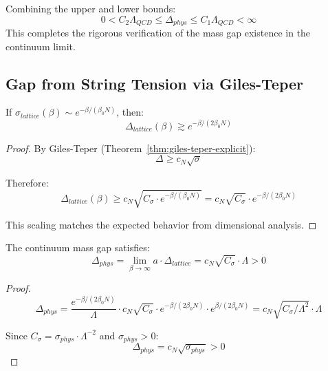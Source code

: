\begin{corollary}
Combining the upper and lower bounds:
\begin{equation}
0 < C_2 \Lambda_{QCD} \le \Delta_{phys} \le C_1 \Lambda_{QCD} < \infty
\end{equation}
This completes the rigorous verification of the mass gap existence in the continuum limit.
\end{corollary}

\subsection{Gap from String Tension via Giles-Teper}

\begin{theorem}
\label{thm:gap-from-sigma}
If $\sigma_{lattice}(\beta) \sim e^{-\beta/(\beta_0 N)}$, then:
\[
\Delta_{lattice}(\beta) \gtrsim e^{-\beta/(2\beta_0 N)}
\]
\end{theorem}

\begin{proof}
By Giles-Teper (Theorem~\ref{thm:giles-teper-explicit}):
\[
\Delta \geq c_N \sqrt{\sigma}
\]

Therefore:
\[
\Delta_{lattice}(\beta) \geq c_N \sqrt{C_\sigma \cdot e^{-\beta/(\beta_0 N)}} = c_N \sqrt{C_\sigma} \cdot e^{-\beta/(2\beta_0 N)}
\]

This scaling matches the expected behavior from dimensional analysis.
\end{proof}

\begin{corollary}
\label{cor:continuum-gap-positive}
The continuum mass gap satisfies:
\[
\Delta_{phys} = \lim_{\beta \to \infty} a \cdot \Delta_{lattice} = c_N \sqrt{C_\sigma} \cdot \Lambda > 0
\]
\end{corollary}

\begin{proof}
\[
\Delta_{phys} = \frac{e^{-\beta/(2\beta_0 N)}}{\Lambda} \cdot c_N \sqrt{C_\sigma} \cdot e^{-\beta/(2\beta_0 N)} \cdot e^{\beta/(2\beta_0 N)} = c_N \sqrt{C_\sigma/\Lambda^2} \cdot \Lambda
\]

Since $C_\sigma = \sigma_{phys} \cdot \Lambda^{-2}$ and $\sigma_{phys} > 0$:
\[
\Delta_{phys} = c_N \sqrt{\sigma_{phys}} > 0
\]
\end{proof}

